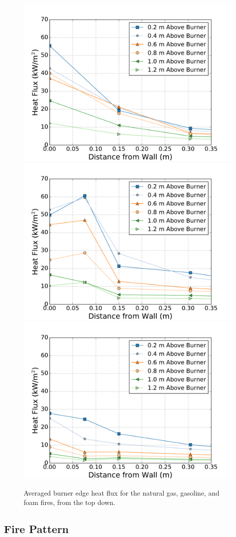 \documentclass[twoside]{uocthesis}
\begin{document}
\begin{figure}[p]
	\centering
	\includegraphics[width=.625\columnwidth]{../Figures/IWGB_NG_HF_Offset_Avg}\\
	\includegraphics[width=.625\columnwidth]{../Figures/IWGB_GAS_HF_Offset_Avg}\\
	\includegraphics[width=.625\columnwidth]{../Figures/IWGB_PUF_HF_Offset_Avg}\\
	\caption[Averaged burner edge heat flux for the natural gas, gasoline, and foam fires]{Averaged burner edge heat flux for the natural gas, gasoline, and foam fires, from the top down.}
	\label{IWGB_HF_Comp_Edge}
\end{figure}


\subsection{Fire Pattern}
\end{document}
